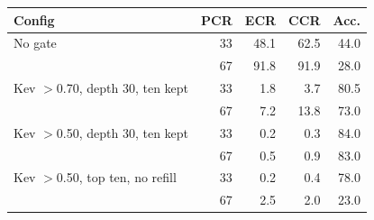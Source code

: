 \begin{tabular}{lrrrr}\toprule
Config & PCR & ECR & CCR & Acc. \\ \midrule
No gate & 33 & 48.1 & 62.5 & 44.0 \\
 & 67 & 91.8 & 91.9 & 28.0 \\
\midrule
Kev $>$0.70, depth 30, ten kept & 33 & 1.8 & 3.7 & 80.5 \\
 & 67 & 7.2 & 13.8 & 73.0 \\
\midrule
Kev $>$0.50, depth 30, ten kept & 33 & 0.2 & 0.3 & 84.0 \\
 & 67 & 0.5 & 0.9 & 83.0 \\
\midrule
Kev $>$0.50, top ten, no refill & 33 & 0.2 & 0.4 & 78.0 \\
 & 67 & 2.5 & 2.0 & 23.0 \\
\bottomrule\end{tabular}
